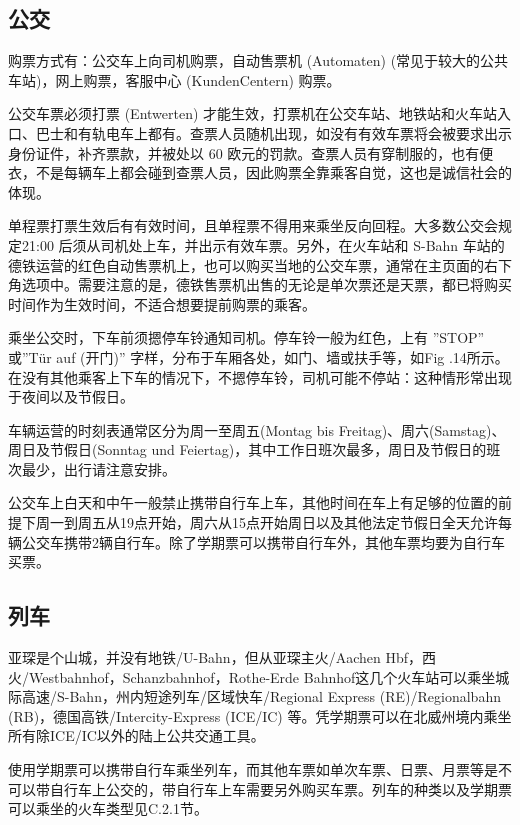   \subsection{公交}

    购票方式有：公交车上向司机购票，自动售票机 (Automaten) (常见于较大的公共车站)，网上购票，客服中心 (KundenCentern) 购票。

    公交车票必须打票 (Entwerten) 才能生效，打票机在公交车站、地铁站和火车站入口、巴士和有轨电车上都有。查票人员随机出现，如没有有效车票将会被要求出示身份证件，补齐票款，并被处以 60 欧元的罚款。查票人员有穿制服的，也有便衣，不是每辆车上都会碰到查票人员，因此购票全靠乘客自觉，这也是诚信社会的体现。 

    单程票打票生效后有有效时间，且单程票不得用来乘坐反向回程。大多数公交会规定21:00 后须从司机处上车，并出示有效车票。另外，在火车站和 S-Bahn 车站的德铁运营的红色自动售票机上，也可以购买当地的公交车票，通常在主页面的右下角选项中。需要注意的是，德铁售票机出售的无论是单次票还是天票，都已将购买时间作为生效时间，不适合想要提前购票的乘客。

    乘坐公交时，下车前须摁停车铃通知司机。停车铃一般为红色，上有 ”STOP” 或”Tür auf (开门)” 字样，分布于车厢各处，如门、墙或扶手等，如Fig .14所示。在没有其他乘客上下车的情况下，不摁停车铃，司机可能不停站：这种情形常出现于夜间以及节假日。

    车辆运营的时刻表通常区分为周一至周五(Montag bis Freitag)、周六(Samstag)、周日及节假日(Sonntag und Feiertag)，其中工作日班次最多，周日及节假日的班次最少，出行请注意安排。

    公交车上白天和中午一般禁止携带自行车上车，其他时间在车上有足够的位置的前提下周一到周五从19点开始，周六从15点开始周日以及其他法定节假日全天允许每辆公交车携带2辆自行车。除了学期票可以携带自行车外，其他车票均要为自行车买票。

  \subsection{列车}

    亚琛是个山城，并没有地铁/U-Bahn，但从亚琛主火/Aachen Hbf，西火/Westbahnhof，Schanzbahnhof，Rothe-Erde Bahnhof这几个火车站可以乘坐城际高速/S-Bahn，州内短途列车/区域快车/Regional Express (RE)/Regionalbahn (RB)，德国高铁/Intercity-Express (ICE/IC) 等。凭学期票可以在北威州境内乘坐所有除ICE/IC以外的陆上公共交通工具。

    使用学期票可以携带自行车乘坐列车，而其他车票如单次车票、日票、月票等是不可以带自行车上公交的，带自行车上车需要另外购买车票。列车的种类以及学期票可以乘坐的火车类型见C.2.1节。

